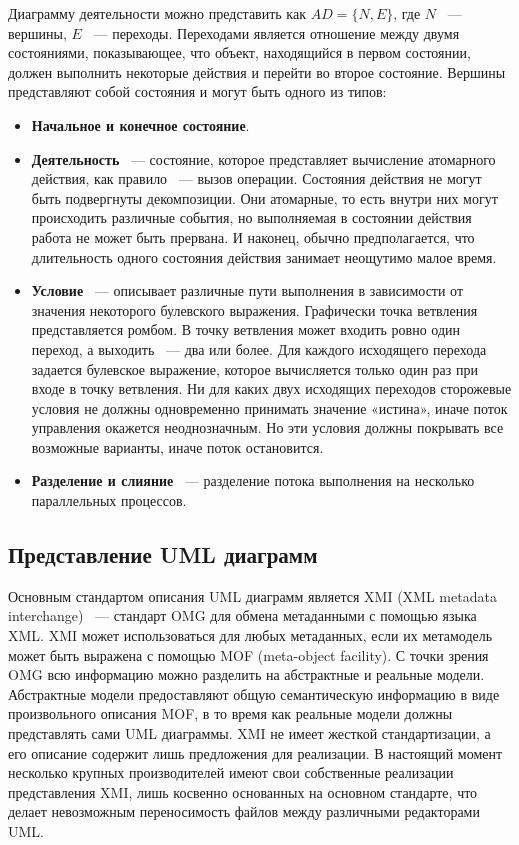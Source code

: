 Диаграмму деятельности можно представить как $ AD = \{ N, E \} $, где $ N $ ~--- вершины, $ E $ ~--- переходы. Переходами является отношение между двумя состояниями, показывающее, что объект, находящийся в первом состоянии, должен выполнить некоторые действия и перейти во второе состояние. Вершины представляют собой состояния и могут быть одного из типов:
\begin{itemize}
\item \textbf{Начальное и конечное состояние}.
\item \textbf{Деятельность} ~--- состояние, которое представляет вычисление атомарного действия, как правило ~--- вызов операции. Состояния действия не могут быть подвергнуты декомпозиции. Они атомарные, то есть внутри них могут происходить различные события, но выполняемая в состоянии действия работа не может быть прервана. И наконец, обычно предполагается, что длительность одного состояния действия занимает неощутимо малое время.
\item \textbf{Условие} ~--- описывает различные пути выполнения в зависимости от значения некоторого булевского выражения. Графически точка ветвления представляется ромбом. В точку ветвления может входить ровно один переход, а выходить ~--- два или более. Для каждого исходящего перехода задается булевское выражение, которое вычисляется только один раз при входе в точку ветвления. Ни для каких двух исходящих переходов сторожевые условия не должны одновременно принимать значение «истина», иначе поток управления окажется неоднозначным. Но эти условия должны покрывать все возможные варианты, иначе поток остановится.
\item \textbf{Разделение и слияние} ~--- разделение потока выполнения на несколько параллельных процессов.
\end{itemize}

\subsection{Представление UML диаграмм}

Основным стандартом описания UML диаграмм является XMI (XML metadata interchange) ~--- стандарт OMG для обмена метаданными с помощью языка XML. XMI может использоваться для любых метаданных, если их метамодель может быть выражена с помощью MOF (meta-object facility). С точки зрения OMG всю информацию можно разделить на абстрактные и реальные модели. Абстрактные модели предоставляют общую семантическую информацию в виде произвольного описания MOF, в то время как реальные модели должны представлять сами UML диаграммы. XMI не имеет жесткой стандартизации, а его описание содержит лишь предложения для реализации. В настоящий момент несколько крупных производителей имеют свои собственные реализации представления XMI, лишь косвенно основанных на основном стандарте, что делает невозможным переносимость файлов между различными редакторами UML.

